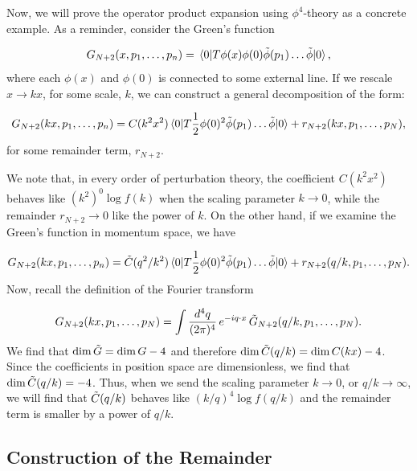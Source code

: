 \documentclass{article}
\begin{document}
Now, we will prove the operator product expansion using $\phi^4$-theory as a concrete example. As a reminder, consider the Green's function

\begin{equation}
    G_{N+2}(x, p_1,\dots, p_n) = \mel{0}{T\phi(x)\phi(0)\Tilde{\phi}(p_1)\dots\Tilde{\phi}}{0},
\end{equation}
where each $\phi(x)$ and $\phi(0)$ is connected to some external line. If we rescale $x \rightarrow kx$, for some scale, $k$, we can construct a general decomposition of the form:

\begin{equation}
    G_{N+2}(kx, p_1,\dots, p_n) = C(k^2x^2)\mel{0}{T\frac{1}{2}\phi(0)^2\Tilde{\phi}(p_1)\dots\Tilde{\phi}}{0} + r_{N+2}(kx,p_1,\dots,p_N),
    \label{green's decomposed}
\end{equation}
for some remainder term, $r_{N+2}$.     

We note that, in every order of perturbation theory, the coefficient $C(k^2x^2)$ behaves like $(k^2)^0\log f(k)$ when the scaling parameter $k\rightarrow 0$, while the remainder $r_{N+2}\rightarrow0$ like the power of $k$. On the other hand, if we examine the Green's function in momentum space, we have 

\begin{equation}
    G_{N+2}(kx, p_1,\dots, p_n) = \Tilde{C}(q^2/k^2)\mel{0}{T\frac{1}{2}\phi(0)^2\Tilde{\phi}(p_1)\dots\Tilde{\phi}}{0} + r_{N+2}(q/k,p_1,\dots,p_N).
    \label{green with remainder}
\end{equation}
Now, recall the definition of the Fourier transform

\begin{equation}
    G_{N+2}(kx,p_1,\dots,p_N) = \int \frac{d^4q}{(2\pi)^4} \, e^{-iq\cdot x} \, \Tilde{G}_{N+2}(q/k,p_1,\dots,p_N).
    \label{green with remainder in momentum}
\end{equation}
We find that $\mathrm{dim}\,\Tilde{G} = \mathrm{dim}\,G-4$ and therefore $\mathrm{dim}\,\Tilde{C}(q/k) = \mathrm{dim}\,C(kx)-4$. Since the coefficients in position space are dimensionless, we find that $\mathrm{dim}\,\Tilde{C}(q/k)=-4$. Thus, when we send the scaling parameter $k\rightarrow 0$, or $q/k \rightarrow \infty$, we will find that $\Tilde{C}(q/k)$ behaves like $(k/q)^4 \log f(q/k) $ and the remainder term is smaller by a power of $q/k$. 

\subsection{Construction of the Remainder}\label{construct remainder}
\end{document}
